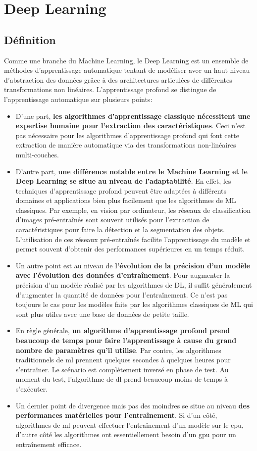 \section{Deep Learning}
    \subsection{Définition}
    Comme une branche du Machine Learning, le Deep Learning est un ensemble de méthodes d'apprentissage automatique tentant de modéliser avec un haut niveau d’abstraction des données grâce à des architectures articulées de différentes transformations non linéaires. L’apprentissage profond se distingue de l’apprentissage automatique sur plusieurs points:
    \begin{itemize}
        \item D’une part, \textbf{les algorithmes d’apprentissage classique nécessitent une expertise humaine pour l’extraction des caractéristiques}. Ceci n’est pas nécessaire pour les algorithmes d’apprentissage profond qui font cette extraction de manière automatique via des transformations non-linéaires multi-couches.
        \item D’autre part, \textbf{une différence notable entre le Machine Learning et le Deep Learning se situe au niveau de l’adaptabilité}. En effet, les techniques d’apprentissage profond peuvent être adaptées à différents domaines et applications bien plus facilement que les algorithmes de ML classiques. Par exemple, en vision par ordinateur, les réseaux de classification d’images pré-entraînés sont souvent utilisés pour l’extraction de caractéristiques pour faire la détection et la segmentation des objets. L’utilisation de ces réseaux pré-entraînés facilite l’apprentissage du modèle et permet souvent d’obtenir des performances supérieures en un temps réduit.
        \item Un autre point est au niveau de \textbf{l’évolution de la précision d’un modèle avec l’évolution des données d’entraînement}. Pour augmenter la précision d’un modèle réalisé par les algorithmes de DL, il suffit généralement d’augmenter la quantité de données pour l’entraînement. Ce n’est pas toujours le cas pour les modèles faits par les algorithmes classiques de ML qui sont plus utiles avec une base de données de petite taille. 
        \item En règle générale, \textbf{un algorithme d’apprentissage profond prend beaucoup de temps pour faire l’apprentissage à cause du grand nombre de paramètres qu’il utilise}. Par contre, les algorithmes traditionnels de \acrshort{ml} prennent quelques secondes à quelques heures pour s’entraîner. Le scénario est complètement inversé en phase de test. Au moment du test, l’algorithme de \acrshort{dl} prend beaucoup moins de temps à s’exécuter. \cite{dahmaneThesis}
        \item Un dernier point de divergence mais pas des moindres se situe au niveau \textbf{des performances matérielles pour l’entraînement}. Si d’un côté, algorithmes de \acrshort{ml} peuvent effectuer l'entraînement d’un modèle sur le \acrshort{cpu}, d’autre côté les algorithmes ont essentiellement besoin d’un \acrshort{gpu} pour un entraînement efficace.
    \end{itemize}
